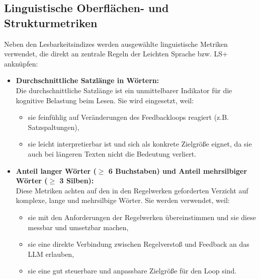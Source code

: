 \subsection{Linguistische Oberflächen- und Strukturmetriken}
Neben den Lesbarkeitsindizes werden ausgewählte linguistische Metriken verwendet, die direkt an zentrale Regeln der Leichten Sprache bzw. LS+ anknüpfen:
\begin{itemize}
	\item \textbf{Durchschnittliche Satzlänge in Wörtern:}\\
	Die durchschnittliche Satzlänge ist ein unmittelbarer Indikator für die kognitive Belastung beim Lesen. Sie wird eingesetzt, weil:
	\begin{itemize}
		\item sie feinfühlig auf Veränderungen des Feedbackloops reagiert (z.B. Satzspaltungen),
		\item sie leicht interpretierbar ist und sich als konkrete Zielgröße eignet, da sie auch bei längeren Texten nicht die Bedeutung verliert.
	\end{itemize}
	\item \textbf{Anteil langer Wörter ($\geq$ 6 Buchstaben) und Anteil mehrsilbiger Wörter ($\geq$ 3 Silben):}\\
	Diese Metriken achten auf den in den Regelwerken geforderten Verzicht auf komplexe, lange und mehrsilbige Wörter. Sie werden verwendet, weil:
	\begin{itemize}
		\item sie mit den Anforderungen der Regelwerken übereinstimmen und sie diese messbar und umsetzbar machen,
		\item sie eine direkte Verbindung zwischen Regelverstoß und Feedback an das LLM erlauben,
		\item sie eine gut steuerbare und anpassbare Zielgröße für den Loop sind.
	\end{itemize}
	

\end{itemize}
